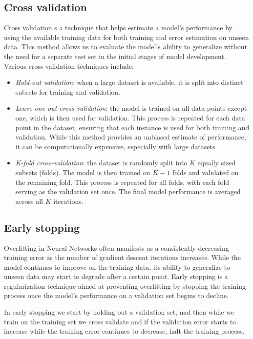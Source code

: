 \subsection{Cross validation}
Cross validation s a technique that helps estimate a model's performance by using the available training data for both training and error estimation on unseen data. 
This method allows us to evaluate the model's ability to generalize without the need for a separate test set in the initial stages of model development.
Various cross validation techniques include:
\begin{itemize}
    \item \textit{Hold-out validation}: when a large dataset is available, it is split into distinct subsets for training and validation. 
    \item \textit{Leave-one-out cross validation}: the model is trained on all data points except one, which is then used for validation. 
        This process is repeated for each data point in the dataset, ensuring that each instance is used for both training and validation. 
        While this method provides an unbiased estimate of performance, it can be computationally expensive, especially with large datasets.
    \item \textit{K-fold cross-validation}: the dataset is randomly split into $K$ equally sized subsets (folds).
        The model is then trained on $K-1$ folds and validated on the remaining fold.
        This process is repeated for all folds, with each fold serving as the validation set once.
        The final model performance is averaged across all $K$ iterations. 
\end{itemize}

\subsection{Early stopping}
Overfitting in Neural Networks often manifests as a consistently decreasing training error as the number of gradient descent iterations increases. 
While the model continues to improve on the training data, its ability to generalize to unseen data may start to degrade after a certain point. 
Early stopping is a regularization technique aimed at preventing overfitting by stopping the training process once the model's performance on a validation set begins to decline.

\noindent In early stopping we start by holding out a validation set, nad then while we train on the training set we cross validate and if the validation error starts to increase while the training error continues to decrease, halt the training process. 

